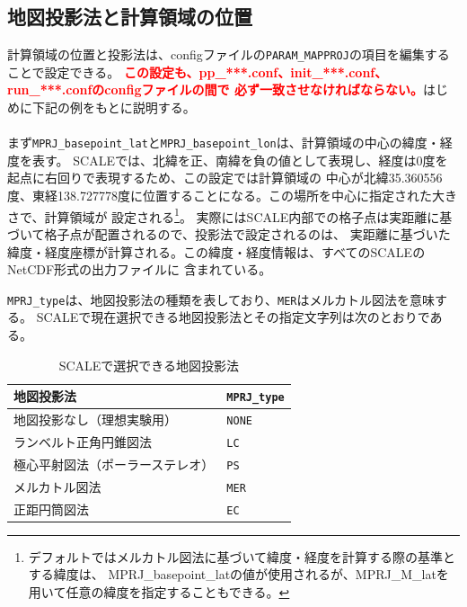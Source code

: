 
\subsection{地図投影法と計算領域の位置} \label{sec:adv_mapproj}
計算領域の位置と投影法は、configファイルの\verb|PARAM_MAPPROJ|の項目を編集することで設定できる。
\textcolor{red}{\bf この設定も、pp\_***.conf、init\_***.conf、run\_***.confのconfigファイルの間で
必ず一致させなければならない。}はじめに下記の例をもとに説明する。\\

\\

\noindent まず\verb|MPRJ_basepoint_lat|と\verb|MPRJ_basepoint_lon|は、計算領域の中心の緯度・経度を表す。
SCALEでは、北緯を正、南緯を負の値として表現し、経度は0度を起点に右回りで表現するため、この設定では計算領域の
中心が北緯35.360556度、東経138.727778度に位置することになる。この場所を中心に指定された大きさで、計算領域が
設定される\footnote{デフォルトではメルカトル図法に基づいて緯度・経度を計算する際の基準とする緯度は、
MPRJ\_basepoint\_latの値が使用されるが、MPRJ\_M\_latを用いて任意の緯度を指定することもできる。}。
実際にはSCALE内部での格子点は実距離に基づいて格子点が配置されるので、投影法で設定されるのは、
実距離に基づいた緯度・経度座標が計算される。この緯度・経度情報は、すべてのSCALEのNetCDF形式の出力ファイルに
含まれている。

\verb|MPRJ_type|は、地図投影法の種類を表しており、\verb|MER|はメルカトル図法を意味する。
SCALEで現在選択できる地図投影法とその指定文字列は次のとおりである。

\begin{table}[htb]
\begin{center}
\caption{SCALEで選択できる地図投影法}
\begin{tabularx}{150mm}{|l|X|} \hline
 \rowcolor[gray]{0.9} 地図投影法 & \verb|MPRJ_type| \\ \hline
 地図投影なし（理想実験用）& \verb|NONE| \\ \hline
 ランベルト正角円錐図法 & \verb|LC| \\ \hline
 極心平射図法（ポーラーステレオ） & \verb|PS| \\ \hline
 メルカトル図法 & \verb|MER| \\ \hline
 正距円筒図法 & \verb|EC| \\ \hline
\end{tabularx}
\label{tab:map_proj}
\end{center}
\end{table}

